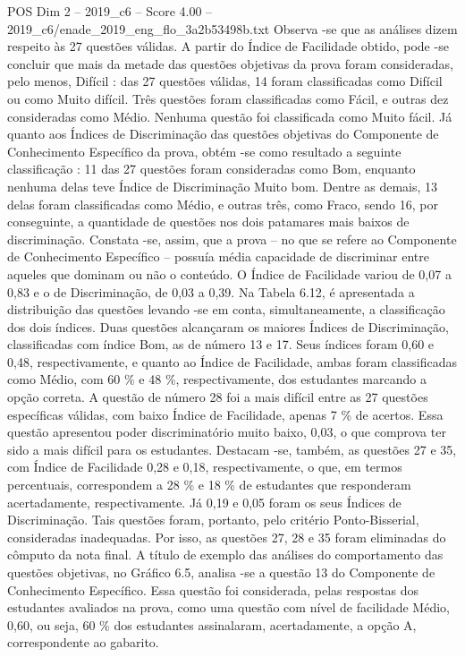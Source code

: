 \begin{textsample}{POS Dim 2 – 2019\_c6 – Score 4.00 – 2019\_c6/enade\_2019\_eng\_flo\_3a2b53498b.txt}
Observa -se que as análises dizem respeito às 27 questões válidas.
A partir do Índice de Facilidade obtido, pode -se concluir que mais da metade das questões objetivas da prova foram consideradas, pelo menos, Difícil : das 27 questões válidas, 14 foram classificadas como Difícil ou como Muito difícil.
Três questões foram classificadas como Fácil, e outras dez consideradas como Médio.
Nenhuma questão foi classificada como Muito fácil.
Já quanto aos Índices de Discriminação das questões objetivas do Componente de Conhecimento Específico da prova, obtém -se como resultado a seguinte classificação : 11 das 27 questões foram consideradas como Bom, enquanto nenhuma delas teve Índice de Discriminação Muito bom.
Dentre as demais, 13 delas foram classificadas como Médio, e outras três, como Fraco, sendo 16, por conseguinte, a quantidade de questões nos dois patamares mais baixos de discriminação.
Constata -se, assim, que a prova – no que se refere ao Componente de Conhecimento Específico – possuía média capacidade de discriminar entre aqueles que dominam ou não o conteúdo.
O Índice de Facilidade variou de 0,07 a 0,83 e o de Discriminação, de 0,03 a 0,39.
Na Tabela 6.12, é apresentada a distribuição das questões levando -se em conta, simultaneamente, a classificação dos dois índices.
Duas questões alcançaram os maiores Índices de Discriminação, classificadas com índice Bom, as de número 13 e 17.
Seus índices foram 0,60 e 0,48, respectivamente, e quanto ao Índice de Facilidade, ambas foram classificadas como Médio, com 60 \% e 48 \%, respectivamente, dos estudantes marcando a opção correta.
A questão de número 28 foi a mais difícil entre as 27 questões específicas válidas, com baixo Índice de Facilidade, apenas 7 \% de acertos.
Essa questão apresentou poder discriminatório muito baixo, 0,03, o que comprova ter sido a mais difícil para os estudantes.
Destacam -se, também, as questões 27 e 35, com Índice de Facilidade 0,28 e 0,18, respectivamente, o que, em termos percentuais, correspondem a 28 \% e 18 \% de estudantes que responderam acertadamente, respectivamente.
Já 0,19 e 0,05 foram os seus Índices de Discriminação.
Tais questões foram, portanto, pelo critério Ponto-Bisserial, consideradas inadequadas.
Por isso, as questões 27, 28 e 35 foram eliminadas do cômputo da nota final.
A título de exemplo das análises do comportamento das questões objetivas, no Gráfico 6.5, analisa -se a questão 13 do Componente de Conhecimento Específico.
Essa questão foi considerada, pelas respostas dos estudantes avaliados na prova, como uma questão com nível de facilidade Médio, 0,60, ou seja, 60 \% dos estudantes assinalaram, acertadamente, a opção A, correspondente ao gabarito.

\end{textsample}
